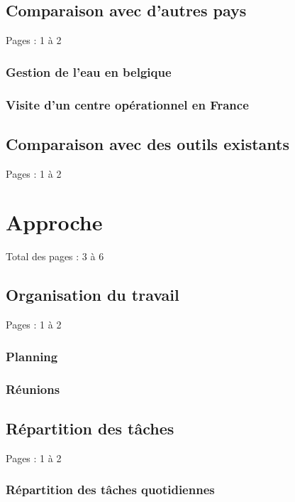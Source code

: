 \documentclass{eplmastersthesis_FR}
\begin{document}
		\section{Comparaison avec d'autres pays}

			Pages : 1 à 2

			\subsection*{Gestion de l'eau en belgique}
			\subsection*{Visite d'un centre opérationnel en France}

		\section{Comparaison avec des outils existants}

			Pages : 1 à 2



	\chapter{Approche}

		Total des pages : 3 à 6

		\section{Organisation du travail}

			Pages : 1 à 2

			\subsection*{Planning}
			\subsection*{Réunions}

		\section{Répartition des tâches}

			Pages : 1 à 2

			\subsection*{Répartition des tâches quotidiennes}
\end{document}
